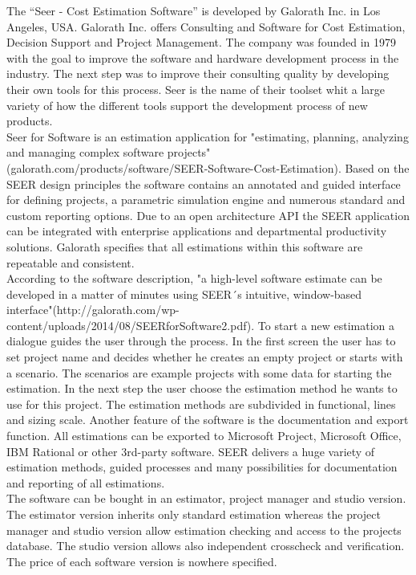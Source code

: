 The “Seer - Cost Estimation Software” is developed by Galorath Inc. in Los Angeles, USA. Galorath Inc. offers Consulting and Software for Cost Estimation, Decision Support and Project Management. The company was founded in 1979 with the goal to improve the software and hardware development process in the industry. The next step was to improve their consulting quality by developing their own tools for this process. Seer is the name of their toolset whit a large variety of how the different tools support the development process of new products.
\\
Seer for Software is an estimation application for "estimating, planning, analyzing and managing complex software projects" (galorath.com/products/software/SEER-Software-Cost-Estimation). Based on the SEER design principles the software contains an annotated and guided interface for defining projects, a parametric simulation engine and numerous standard and custom reporting options. Due to an open architecture API the SEER application can be integrated with enterprise applications and departmental productivity solutions. Galorath specifies that all estimations within this software are repeatable and consistent.
\\
According to the software description, "a high-level software estimate can be developed in a matter of minutes using SEER´s intuitive, window-based interface"(http://galorath.com/wp-content/uploads/2014/08/SEERforSoftware2.pdf). To start a new estimation a dialogue guides the user through the process. In the first screen the user has to set project name and decides whether he creates an empty project or starts with a scenario. The scenarios are example projects with some data for starting the estimation. In the next step the user choose the estimation method he wants to use for this project. The estimation methods are subdivided in functional, lines and sizing scale. Another feature of the software is the documentation and export function. All estimations can be exported to Microsoft Project, Microsoft Office, IBM Rational or other 3rd-party software. SEER delivers a huge variety of estimation methods, guided processes and many possibilities for documentation and reporting of all estimations.
\\
The software can be bought in an estimator, project manager and studio version. The estimator version inherits only standard estimation whereas the project manager and studio version allow estimation checking and access to the projects database. The studio version allows also independent crosscheck and verification. The price of each software version is nowhere specified.

